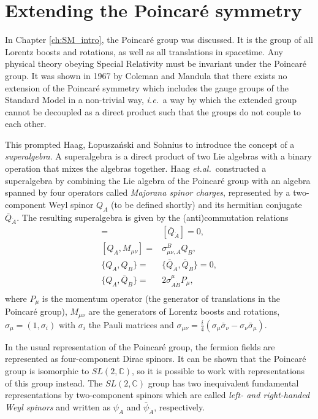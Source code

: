 \documentclass[twoside,english]{uiofysmaster}
\begin{document}
\section{Extending the Poincar\'{e} symmetry}
In Chapter \ref{ch:SM_intro}, the Poincar\'{e} group was discussed. It is the group of all Lorentz boosts and rotations, as well as all translations in spacetime. Any physical theory obeying Special Relativity must be invariant under the Poincar\'{e} group. It was shown in 1967 by Coleman and Mandula \cite{PhysRev.159.1251} that there exists no extension of the Poincar\'{e} symmetry which includes the gauge groups of the Standard Model in a non-trivial way, {\it i.e.}\ a way by which the extended group cannot be decoupled as a direct product such that the groups do not couple to each other. 

This prompted Haag, \L{}opusza\'{n}ski and Sohnius \cite{Haag1975257} to introduce the concept of a {\it superalgebra}. A superalgebra is a direct product of two Lie algebras with a binary operation that mixes the algebras together. Haag {\it et.al.}\ constructed a superalgebra by combining the Lie algebra of the Poincar\'{e} group with an algebra spanned by four operators called {\it Majorana spinor charges}, represented by a two-component Weyl spinor $Q_A$ (to be defined shortly) and its hermitian conjugate $\bar Q_{\dot A}$. The resulting superalgebra is given by the (anti)commutation relations
\begin{align}
	[Q_A,P_\mu] =& [\bar Q_{\dot A}] = 0,\\
	[Q_A, M_{\mu\nu}] =& \sigma_{\mu\nu,A}^B Q_B,\\
	\{Q_A, Q_B\} =& \{\bar Q_{\dot A}, \bar Q_{\dot B} \} = 0,\\
	\{Q_A, \bar Q_{\dot B} \} =& 2\sigma^\mu_{A \dot B} P_\mu,\\
\end{align}
where $P_\mu$ is the momentum operator (the generator of translations in the Poincar\'{e} group), $M_{\mu\nu}$ are the generators of Lorentz boosts and rotations, $\sigma_\mu = (1,\sigma_i)$ with $\sigma_i$ the Pauli matrices and $\sigma_{\mu\nu} = \frac{i}{4}(\sigma_\mu \bar\sigma_\nu - \sigma_\nu \bar\sigma_\mu)$. 

In the usual representation of the Poincar\'{e} group, the fermion fields are represented as four-component Dirac spinors. It can be shown that the Poincar\'{e} group is isomorphic to $SL(2,\mathbb{C})$, so it is possible to work with representations of this group instead. The $SL(2,\mathbb{C})$ group has two inequivalent fundamental representations by two-component spinors which are called {\it left- and right-handed Weyl spinors} and written as $\psi_A$ and $\bar\psi_{\dot A}$, respectively. 
\end{document}
